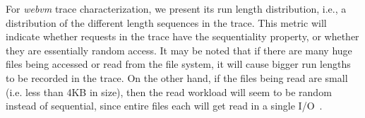 For \textit{webvm} trace characterization, we present its run length
distribution, i.e., a distribution of the different length sequences
in the trace. This metric will indicate whether requests in the
trace have the sequentiality property, or whether they are essentially
random access. It may be noted that if there are many huge files being
accessed or read from the file system, it will cause bigger run lengths
to be recorded in the trace. On the other hand, if the files being read are 
small (i.e. less than 4KB in size), then the read workload will seem to be
random instead of sequential, since entire files
each will get read in a single I/O~\cite{animation-nfs}.

\begin{figure}[t]
	\centering
	\hfill

\end{figure}
